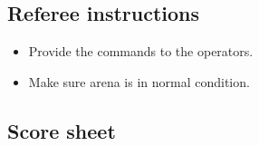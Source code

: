 \subsection*{Referee instructions}
\begin{itemize}[nosep]
	\item Provide the commands to the operators.
	\item Make sure arena is in normal condition.
\end{itemize}


\subsection*{Score sheet}


